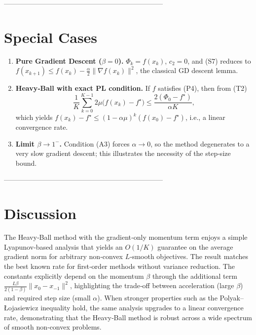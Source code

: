 \documentclass{article}
\begin{document}
---------------------------------------------------------------------

\section*{Special Cases}

\begin{enumerate}[label={\bf S\arabic*}.]
\item \textbf{Pure Gradient Descent ($\beta=0$).}  
$\Phi_{k}=f(x_{k})$, $c_{2}=0$, and (S7) reduces to
$f(x_{k+1})\le f(x_{k})-\frac{\alpha}{2}\|\nabla f(x_{k})\|^{2}$,
the classical GD descent lemma.

\item \textbf{Heavy‑Ball with exact PL condition.}  
If $f$ satisfies (P4), then from (T2)
\[
\frac{1}{K}\sum_{k=0}^{K-1}2\mu\bigl(f(x_{k})-f^{\star}\bigr)
\le\frac{2(\Phi_{0}-f^{\star})}{\alpha K},
\]
which yields $f(x_{k})-f^{\star}\le(1-\alpha\mu)^{k}(f(x_{0})-f^{\star})$,
i.e., a linear convergence rate.

\item \textbf{Limit $\beta\to1^{-}$.}  
Condition (A3) forces $\alpha\to0$, so the method degenerates to a
very slow gradient descent; this illustrates the necessity of the
step‑size bound.
\end{enumerate}

---------------------------------------------------------------------

\section*{Discussion}

The Heavy‑Ball method with the gradient‑only momentum term enjoys a simple
Lyapunov‑based analysis that yields an $O(1/K)$ guarantee on the average
gradient norm for arbitrary non‑convex $L$‑smooth objectives.  The result
matches the best known rate for first‑order methods without variance
reduction.  The constants explicitly depend on the momentum $\beta$ through
the additional term $\frac{L\beta}{2(1-\beta)}\|x_{0}-x_{-1}\|^{2}$,
highlighting the trade‑off between acceleration (large $\beta$) and
required step size (small $\alpha$).  When stronger properties such as the
Polyak–Łojasiewicz inequality hold, the same analysis upgrades to a linear
convergence rate, demonstrating that the Heavy‑Ball method is robust across
a wide spectrum of smooth non‑convex problems.
\end{document}
